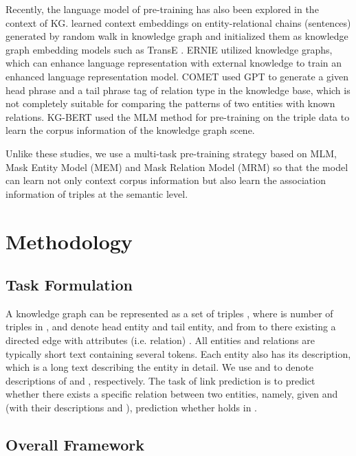 \documentclass[journal]{IEEEtran}
\begin{document}
Recently, the language model of pre-training has also been explored in the context of KG. \cite{wang2018dolores} learned context embeddings on entity-relational chains (sentences) generated by random walk in knowledge graph and initialized them as knowledge graph embedding models such as TransE \cite{bordes2013translating}. ERNIE \cite{zhang2019ernie} utilized knowledge graphs, which can enhance language representation with external knowledge to train an enhanced language representation model. COMET \cite{bosselut2019comet} used GPT to generate a given head phrase and a tail phrase tag of relation type in the knowledge base, which is not completely suitable for comparing the patterns of two entities with known relations. KG-BERT \cite{yao2019kg} used the MLM method for pre-training on the triple data to learn the corpus information of the knowledge graph scene.

Unlike these studies, we use a multi-task pre-training strategy based on MLM, Mask Entity Model (MEM) and Mask Relation Model (MRM) so that the model can learn not only context corpus information but also learn the association information of triples at the semantic level.



\section{Methodology}{\label{methods}}

\subsection{Task Formulation}
A knowledge graph  can be represented as a set of triples , where  is number of triples in ,  and  denote head entity and tail entity, and from  to  there existing a directed edge with attributes (i.e. relation) . All entities and relations are typically short text containing several tokens. Each entity also has its description, which is a long text describing the entity in detail. We use  and  to denote descriptions of  and , respectively. The task of link prediction is to predict whether there exists a specific relation between two entities, namely, given  and  (with their descriptions  and ), prediction whether  holds in .


\subsection{Overall Framework}
\end{document}
